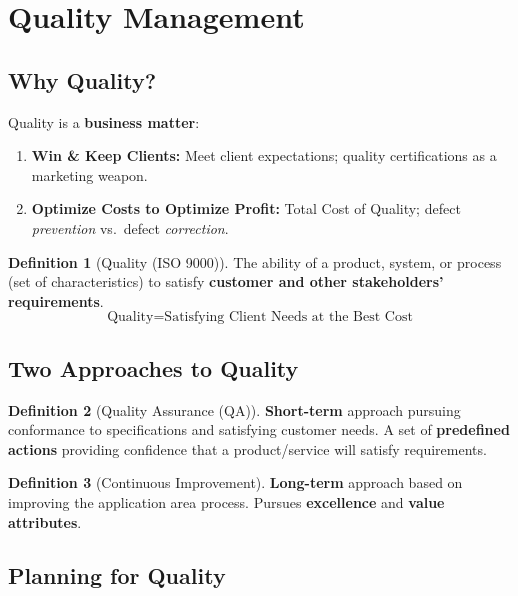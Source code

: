 \documentclass[11pt,a4paper]{article}
\theoremstyle{definition}
\newtheorem{definition}{Definition}[section]
\theoremstyle{plain}
\begin{document}
\section{Quality Management}

\subsection{Why Quality?}

Quality is a \textbf{business matter}:
\begin{enumerate}[nosep, label=\arabic*.]
  \item \textbf{Win \& Keep Clients:} Meet client expectations; quality certifications as a marketing weapon.
  \item \textbf{Optimize Costs to Optimize Profit:} Total Cost of Quality; defect \emph{prevention} vs.\ defect \emph{correction}.
\end{enumerate}

\begin{definition}[Quality (ISO 9000)]
The ability of a product, system, or process (set of characteristics) to satisfy \textbf{customer and other stakeholders' requirements}.
\[
  \text{Quality} = \text{Satisfying Client Needs at the Best Cost}
\]
\end{definition}

\subsection{Two Approaches to Quality}

\begin{definition}[Quality Assurance (QA)]
\textbf{Short-term} approach pursuing conformance to specifications and satisfying customer needs. A set of \textbf{predefined actions} providing confidence that a product/service will satisfy requirements.
\end{definition}

\begin{definition}[Continuous Improvement]
\textbf{Long-term} approach based on improving the application area process. Pursues \textbf{excellence} and \textbf{value attributes}.
\end{definition}

\subsection{Planning for Quality}
\end{document}
